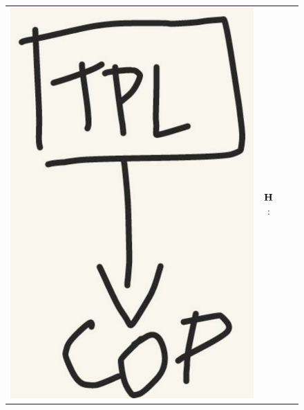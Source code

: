 \begin{figure}[t]
\begin{tabular}[h]{cccl}
    \includegraphics[scale=0.2]{../img/ex2_intervalgr.pdf} &
    ${\bf H}$: 

\end{tabular}
\end{figure}
